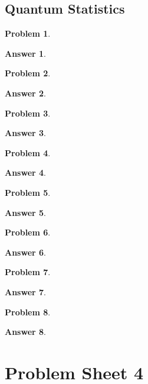 \documentclass[a4paper]{article}
\newtheorem{ans}{Answer}[section]
\theoremstyle{new}
\newtheorem{qns}{Problem}[section]
\begin{document}
\subsection*{Quantum Statistics}
\begin{qns}

\end{qns}
\begin{ans}

\end{ans}
\begin{qns}

\end{qns}
\begin{ans}

\end{ans}
\newpage
\begin{qns}

\end{qns}
\begin{ans}

\end{ans}
\begin{qns}

\end{qns}
\begin{ans}

\end{ans}
\newpage
\begin{qns}

\end{qns}
\begin{ans}

\end{ans}
\begin{qns}

\end{qns}
\begin{ans}

\end{ans}
\newpage
\begin{qns}

\end{qns}
\begin{ans}

\end{ans}
\begin{qns}

\end{qns}
\begin{ans}

\end{ans}

\newpage
\section{Problem Sheet 4}
\end{document}
